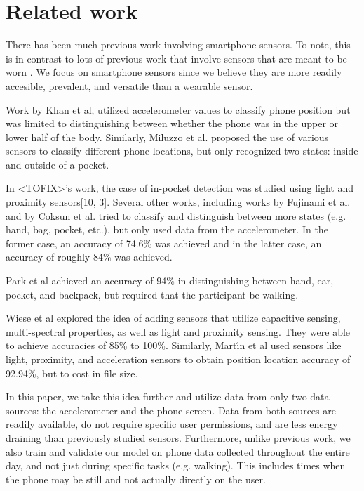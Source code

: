 \section{Related work}
There has been much previous work involving smartphone sensors.
To note, this is in contrast to lots of previous work that involve sensors that are meant to be worn \cite{Kunze2005WhereAI}.
We focus on smartphone sensors since we believe they are more readily accesible, prevalent, and versatile than a wearable sensor.

Work by Khan et al, utilized accelerometer values to classify phone position 
but was limited to distinguishing between whether the phone was in the upper or lower half of the body.
Similarly, Miluzzo et al. proposed the use of various sensors to classify different phone locations, 
but only recognized two states: inside and outside of a pocket.


 In <TOFIX>'s work, the case of in-pocket detection was studied using light and proximity sensors[10, 3].
Several other works, including works by Fujinami et al. and by Coksun et al. tried to classify and distinguish between more states (e.g. hand, bag, pocket, etc.), but only used data from the accelerometer. 
In the former case, an accuracy of 74.6\% was achieved and in the latter case, an accuracy of roughly 84\% was achieved.

Park et al achieved an accuracy of 94\% in distinguishing between hand, ear, pocket, and backpack, but required that the participant be walking. 



Wiese et al explored the idea of adding sensors that utilize capacitive sensing,  multi-spectral properties, as well as light and proximity sensing.
They were able to achieve accuracies of 85\% to 100\%.
Similarly, Mart\'{\i}n et al used sensors like light, proximity, and acceleration sensors
to obtain position location accuracy of 92.94\%, but to cost in file size. 

In this paper, we take this idea further and utilize data from only two data sources: the accelerometer and the phone screen. 
Data from both sources are readily available, do not require specific user permissions, and are less energy draining than previously studied sensors.
Furthermore, unlike previous work, we also train and validate our model on phone data collected throughout the entire day, and not just during specific tasks (e.g. walking).
This includes times when the phone may be still and not actually directly on the user.







